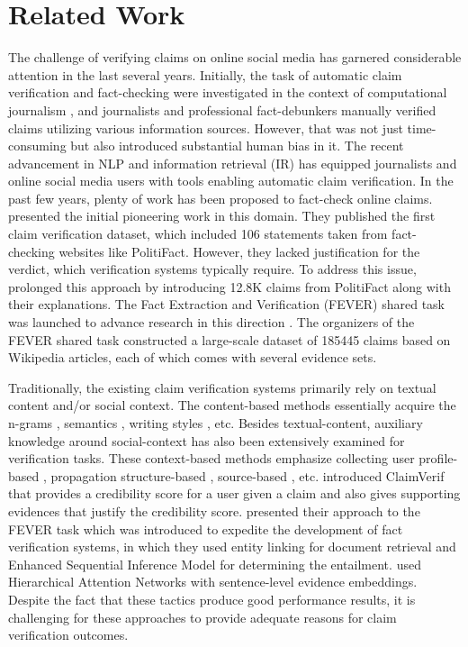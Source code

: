 \documentclass[11pt]{article}
\begin{document}
\section{Related Work}
The challenge of verifying claims on online social media has garnered considerable attention in the last several years. Initially, the task of automatic claim verification and fact-checking were investigated in the context of computational journalism \cite{cohen2011computation,flew2012promise}, and journalists and professional fact-debunkers manually verified claims utilizing various information sources. However, that was not just time-consuming but also introduced substantial human bias in it. The recent advancement in NLP and information retrieval (IR) has equipped journalists and online social media users with tools enabling automatic claim verification. In the past few years, plenty of work has been proposed to fact-check online claims. \citet{vlachos-riedel-2014-fact} presented the initial pioneering work in this domain. They published the first claim verification dataset, which included 106 statements taken from fact-checking websites like PolitiFact.  However, they lacked justification for the verdict, which verification systems typically require. To address this issue,  \citet{wang-2017-liar} prolonged this approach by introducing 12.8K claims from PolitiFact along with their explanations. The Fact Extraction and Verification (FEVER) shared task was launched to advance research in this direction \cite{thorne-etal-2018-fact}. The organizers of the FEVER shared task constructed a large-scale dataset of 185445 claims based on Wikipedia articles, each of which comes with several evidence sets. 

Traditionally, the existing claim verification systems primarily rely on textual content and/or social context. The content-based methods essentially acquire the n-grams \cite{wang-2017-liar}, semantics \cite{khattar2019mvae}, writing styles \cite{grondahl2019text}, etc. Besides textual-content, auxiliary knowledge around social-context has also been extensively examined for verification tasks. These context-based methods emphasize collecting user profile-based \cite{shu2019beyond}, propagation structure-based \cite{wei2019modeling}, source-based \cite{pennycook2019fighting}, etc. \citet{zhi2017claimverif} introduced ClaimVerif that provides a credibility score for a user given a claim and also gives supporting evidences that justify the credibility score.    \citet{hanselowski-etal-2018-ukp} presented their approach to the FEVER task \cite{thorne-etal-2018-fact} which was introduced to expedite the development of fact verification systems, in which they used entity linking for document retrieval and Enhanced Sequential Inference Model for determining the entailment. \citet{ma2019sentence} used Hierarchical Attention Networks with sentence-level evidence embeddings. Despite the fact that these tactics produce good performance results, it is challenging for these approaches to provide adequate reasons for claim verification outcomes. \\
\end{document}
